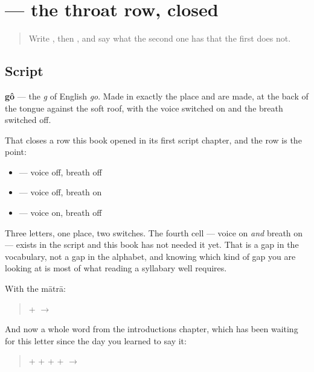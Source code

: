 \section[\texorpdfstring{\bn{গ} (gô)}{গ (gô)}]{ — the throat row, closed}

\label{lesson:BN-W03-ga}



\begin{quote}
Write \textbf{}, then \textbf{}, and say what the second one has that the first does not.
\end{quote}

\subsection*{Script}
\begin{quote}
\end{quote}

\textbf{gô} — the \emph{g} of English \emph{go}. Made in exactly the place \textbf{} and \textbf{} are made, at the back of the tongue against the soft roof, with the voice switched on and the breath switched off.

That closes a row this book opened in its first script chapter, and the row is the point:

\begin{itemize}
\raggedright
  \item \textbf{} — voice off, breath off
  \item \textbf{} — voice off, breath on
  \item \textbf{} — voice on, breath off
\end{itemize}

Three letters, one place, two switches. The fourth cell — voice on \emph{and} breath on — exists in the script and this book has not needed it yet. That is a gap in the vocabulary, not a gap in the alphabet, and knowing which kind of gap you are looking at is most of what reading a syllabary well requires.

With the mātrā:

\begin{quote}
\textbf{} + \textbf{} $\to$ \textbf{}
\end{quote}

And now a whole word from the introductions chapter, which has been waiting for this letter since the day you learned to say it:

\begin{quote}
\textbf{} + \textbf{} + \textbf{} + \textbf{} + \textbf{} $\to$ \textbf{}
\end{quote}

